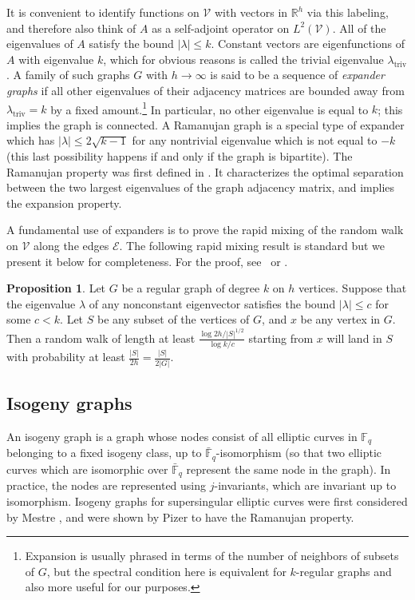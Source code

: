 \documentclass[jmc]{degruyter-journal-a}
\theoremstyle{definition}
\newtheorem{prop}[theorem]{Proposition}
\newcommand{\RR}{{\mathbb{R}}}
\newcommand{\FF}{{\mathbb{F}}}
\newcommand{\VV}{{\mathcal{V}}}
\newcommand{\EE}{{\mathcal{E}}}
\begin{document}
It is convenient to identify functions on $\VV$ with vectors in
$\RR^h$ via this labeling, and therefore also think of $A$ as a
self-adjoint operator on $L^2(\VV)$.  All of the eigenvalues of $A$
satisfy the bound $|\lambda| \leq k$. Constant vectors are
eigenfunctions of $A$ with eigenvalue $k$, which for obvious reasons
is called the trivial eigenvalue $\lambda_{\operatorname{triv}}$. A
family of such graphs $G$ with $h \rightarrow \infty$ is said to be a
sequence of \emph{expander graphs} if all other eigenvalues of their
adjacency matrices are bounded away from
$\lambda_{\operatorname{triv}}= k$ by a fixed
amount.\footnote{Expansion is usually phrased in terms of the number
  of neighbors of subsets of $G$, but the spectral condition here is
  equivalent for $k$-regular graphs and also more useful for our
  purposes.}  In particular, no other eigenvalue is equal to $k$; this
implies the graph is connected.  A Ramanujan graph is a special type
of expander which has $|\lambda| \leq 2\sqrt{k-1}$ for any nontrivial
eigenvalue which is not equal to $-k$ (this last possibility happens
if and only if the graph is bipartite). The Ramanujan property was
first defined in \cite{LubPS}. It characterizes the optimal separation
between the two largest eigenvalues of the graph adjacency matrix, and
implies the expansion property.

A fundamental use of expanders is to prove the rapid mixing of the
random walk on $\VV$ along the edges $\EE$. The following rapid mixing
result is standard but we present it below for completeness. For the
proof, see~\cite{JMV} or \cite{DSV,Lub,Sarnak}.

\begin{prop}\label{prop:mixing} Let $G$ be a regular graph of degree
  $k$ on $h$ vertices. Suppose that the eigenvalue $\lambda$ of any
  nonconstant eigenvector satisfies the bound $|\lambda| \leq c$ for
  some $c < k$. Let $S$ be any subset of the vertices of $G$, and $x$
  be any vertex in $G$. Then a random walk of length at least
  $\frac{\log 2h/|S|^{1/2}}{\log k/c}$ starting from $x$ will land in
  $S$ with probability at least $\frac{|S|}{2h} = \frac{|S|}{2|G|}$.
\end{prop}

\subsection{Isogeny graphs}\label{isog_graph} 

An isogeny graph is a graph whose nodes consist of all elliptic curves
in $\FF_q$ belonging to a fixed isogeny class, up to
$\bar{\FF}_q$-isomorphism (so that two elliptic curves which are
isomorphic over $\bar{\FF}_q$ represent the same node in the
graph). In practice, the nodes are represented using $j$-invariants,
which are invariant up to isomorphism. 
Isogeny graphs for supersingular elliptic curves were first considered
by Mestre \cite{Mestre}, and were shown by Pizer \cite{pizer1,pizer2}
to have the Ramanujan property.
\end{document}
